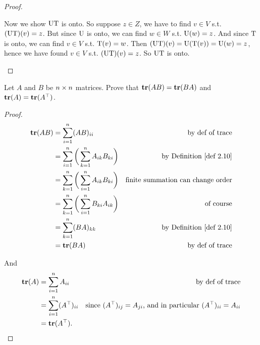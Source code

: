 \begin{proof}
\begin{enumerate}
Now we show \(\mathrm{U}\mathrm{T}\) is onto.
So suppose \(z \in Z\), we have to find \(v \in V\) s.t. \((\mathrm{U}\mathrm{T})(v) = z\).
But since \(\mathrm{U}\) is onto, we can find \(w \in W\) s.t. \(\mathrm{U}(w) = z\).
And since \(\mathrm{T}\) is onto, we can find \(v \in V\) s.t. \(\mathrm{T}(v) = w\).
Then \((\mathrm{U}\mathrm{T})(v) = \mathrm{U}(\mathrm{T}(v)) = \mathrm{U}(w) = z\),
hence we have found \(v \in V\) s.t. \((\mathrm{U}\mathrm{T})(v) = z\).
So \(\mathrm{U}\mathrm{T}\) is onto.
\end{enumerate}
\end{proof}

\begin{exercise} \label{exercise 2.3.13}
Let \(A\) and \(B\) be \(n \times n\) matrices.
Prove that \(\textbf{tr}(AB) = \textbf{tr}(BA)\) and \(\textbf{tr}(A) = \textbf{tr}(A^\top)\).
\end{exercise}

\begin{proof}
\begin{align*}
    \TRACE(AB) & = \sum_{i = 1}^n (AB)_{ii} & \text{by def of trace} \\
               & = \sum_{i = 1}^n \bigg( \sum_{k = 1}^n A_{ik} B_{ki} \bigg) & \text{by \DEF{2.10}} \\
               & = \sum_{k = 1}^n \bigg( \sum_{i = 1}^n A_{ik} B_{ki} \bigg) & \text{finite summation can change order} \\
               & = \sum_{k = 1}^n \bigg( \sum_{i = 1}^n B_{ki} A_{ik} \bigg) & \text{of course} \\
               & = \sum_{k = 1}^n (BA)_{kk} & \text{by \DEF{2.10}} \\
               & = \TRACE(BA) & \text{by def of trace}
\end{align*}

And
\begin{align*}
    \textbf{tr}(A) & = \sum_{i = 1}^n A_{ii} & \text{by def of trace} \\
              & = \sum_{i = 1}^n (A^\top)_{ii} & \text{since \((A^\top)_{ij} = A_{ji}\), and in particular \((A^\top)_{ii} = A_{ii}\)} \\
              & = \textbf{tr}(A^\top).
\end{align*}
\end{proof}

